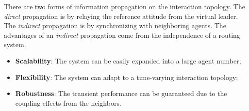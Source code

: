 There are two forms of information propagation on the interaction topology.
The \emph{direct} propagation is by relaying the reference attitude from the virtual leader.
The \emph{indirect} propagation is by synchronizing with neighboring agents. 
The advantages of an \emph{indirect} propagation come from the independence of a routing system.
\begin{itemize}
\item \textbf{Scalability}: The system can be easily expanded into a large agent number;
\item \textbf{Flexibility}: The system can adapt to a time-varying interaction topology;
\item \textbf{Robustness}: The transient performance can be guaranteed due to the coupling effects from the neighbors.
\end{itemize}

